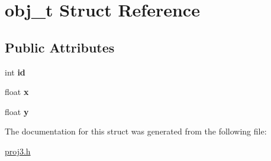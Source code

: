\hypertarget{structobj__t}{}\section{obj\+\_\+t Struct Reference}
\label{structobj__t}
\subsection*{Public Attributes}
\begin{DoxyCompactItemize}
\item 
\hypertarget{structobj__t_a603ae185ae536cecefa2015ad574d4a3}{}\label{structobj__t_a603ae185ae536cecefa2015ad574d4a3} 
int {\bfseries id}
\item 
\hypertarget{structobj__t_af688845648ce2b4781c232c475d9fa81}{}\label{structobj__t_af688845648ce2b4781c232c475d9fa81} 
float {\bfseries x}
\item 
\hypertarget{structobj__t_a1101f5b48ee96a247c71aa8a33feb2bb}{}\label{structobj__t_a1101f5b48ee96a247c71aa8a33feb2bb} 
float {\bfseries y}
\end{DoxyCompactItemize}


The documentation for this struct was generated from the following file\+:\begin{DoxyCompactItemize}
\item 
\hyperlink{proj3_8h}{proj3.\+h}\end{DoxyCompactItemize}
